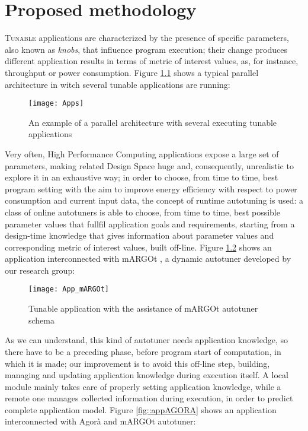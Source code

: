 \chapter{Proposed methodology}\label{methodology}

\lettrine{T}{unable} applications are characterized by the presence of specific parameters, also known as \textit{knobs}, that influence program execution; their change produces different application results in terms of metric of interest values, as, for instance, throughput or power consumption. Figure \ref{fig::appDef} shows a typical parallel architecture in witch several tunable applications are running:

\begin{figure}[H]

    \centering
    \texttt{[image: Apps]}
    \caption{An example of a parallel architecture with several executing tunable applications}
    \label{fig::appDef}
    
\end{figure}

Very often, High Performance Computing applications expose a large set of parameters, making related Design Space huge and, consequently, unrealistic to explore it in an exhaustive way; in order to choose, from time to time, best program setting with the aim to improve energy efficiency with respect to power consumption and current input data, the concept of runtime autotuning is used: a class of online autotuners is able to choose, from time to time, best possible parameter values that fullfil application goals and requirements, starting from a design-time knowledge that gives information about parameter values and corresponding metric of interest values, built off-line. Figure \ref{fig::appAut} shows an application interconnected with mARGOt \cite{gadioli2015application}, a dynamic autotuner developed by our research group:

\begin{figure}[H]

    \centering
    \texttt{[image: App\_mARGOt]}
    \caption{Tunable application with the assistance of mARGOt autotuner schema}
    \label{fig::appAut}
    
\end{figure}

As we can understand, this kind of autotuner needs application knowledge, so there have to be a preceding phase, before program start of computation, in which it is made; our improvement is to avoid this off-line step, building, managing and updating application knowledge during execution itself. A local module mainly takes care of properly setting application knowledge, while a remote one manages collected information during execution, in order to predict complete application model. Figure \ref{fig::appAGORA} shows an application interconnected with Agorà and mARGOt autotuner:

